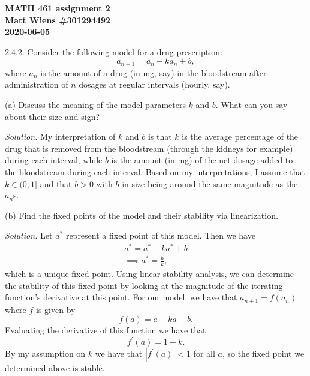 \documentclass{article}
\newcommand{\as}{a^*}
\begin{document}
\textbf{MATH 461 assignment 2} \\
\textbf{Matt Wiens \#301294492} \\
\textbf{2020-06-05}

2.4.2. Consider the following model for a drug prescription:
%
\begin{equation*}
    a_{n + 1} = a_n - k a_n + b,
\end{equation*}
%
where $a_n$ is the amount of a drug (in mg, say) in the bloodstream
after administration of $n$ dosages at regular intervals (hourly, say).

(a) Discuss the meaning of the model parameters $k$ and $b$. What can
you say about their size and sign?

\textit{Solution.}
My interpretation of $k$ and $b$ is that $k$ is the average percentage of the
drug that is removed from the bloodstream (through the kidneys for
example) during each interval, while $b$ is the amount (in mg) of the net dosage added to the
bloodstream during each interval. Based on my interpretations, I assume
that $k \in (0, 1]$ and that $b > 0$ with $b$ in size being around the
same magnitude as the $a_n$s.

\vspace{5mm}

(b) Find the fixed points of the model and their stability via linearization.

\textit{Solution.}
Let $\as$ represent a fixed point of this model. Then we have
%
\begin{align*}
    \as = \as - k \as + b \\
    \implies \as = \frac{b}{k}
    ,
\end{align*}
%
which is a unique fixed point. Using linear stability analysis, we can
determine the stability of this fixed point by looking at the magnitude
of the iterating function's derivative at this point. For our model,
we have that $a_{n + 1} = f(a_n)$ where $f$ is given by
%
\begin{equation*}
    f(a) = a - k a + b
    .
\end{equation*}
%
Evaluating the derivative of this function we have that
%
\begin{equation*}
    f^\prime(a) = 1 - k
    .
\end{equation*}
%
By my assumption on $k$ we have that $|f^\prime(a)| < 1$ for all $a$, so
the fixed point we determined above is stable.

\vspace{5mm}
\end{document}
